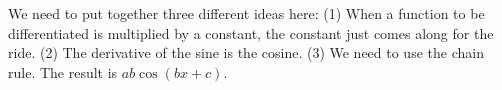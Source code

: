We need to put together three different ideas here: (1) When a function to be
differentiated is multiplied by a constant, the constant just comes along for the ride.                                        
(2) The derivative of the sine is the cosine. (3) We need to use the chain rule.
The result is $ab\cos(bx+c)$.
